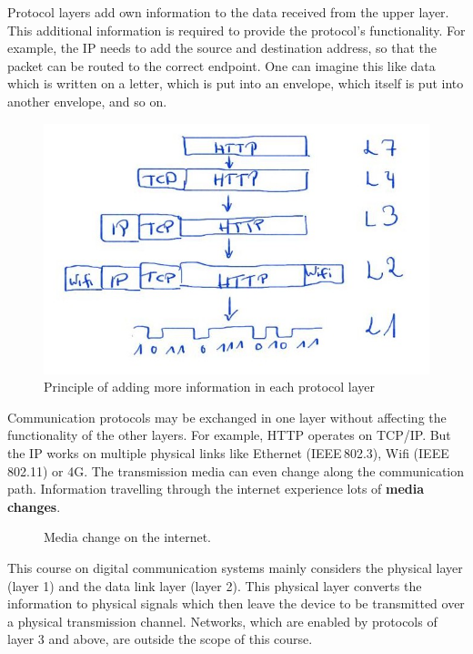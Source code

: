 \begin{refsection}
Protocol layers add own information to the data received from the upper layer. This additional information is required to provide the protocol's functionality. For example, the \acf{IP} needs to add the source and destination address, so that the packet can be routed to the correct endpoint. One can imagine this like data which is written on a letter, which is put into an envelope, which itself is put into another envelope, and so on.

\begin{figure}[H]
	\centering
	\includegraphics{../chapter01/Frame_Wrapping.jpg}
	\caption{Principle of adding more information in each protocol layer}
	\label{fig:ch01:frame_construction}
\end{figure}

Communication protocols may be exchanged in one layer without affecting the functionality of the other layers. For example, \ac{HTTP} operates on \acs{TCP}/\acs{IP}. But the \acf{IP} works on multiple physical links like Ethernet (IEEE\,802.3), Wifi (IEEE\,802.11) or 4G. The transmission media can even change along the communication path. Information travelling through the internet experience lots of  \textbf{media changes}.


\begin{figure}[H]
	\centering
	\caption{Media change on the internet. }
	\label{fig:ch01:media_changes}
\end{figure}

This course on digital communication systems mainly considers the physical layer (layer 1) and the data link layer (layer 2). This physical layer converts the information to physical signals which then leave the device to be transmitted over a physical transmission channel. Networks, which are enabled by protocols of layer 3 and above, are outside the scope of this course.



\end{refsection}

